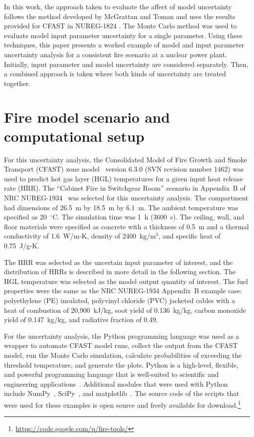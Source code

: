 \documentclass[12pt]{article}
\begin{document}
In this work, the approach taken to evaluate the affect of model uncertainty follows the method developed by McGrattan and Toman and uses the results provided for CFAST in NUREG-1824 \cite{NUREG_1824_Sup_1}. The Monte Carlo method was used to evaluate model input parameter uncertainty for a single parameter. Using these techniques, this paper presents a worked example of model and input parameter uncertainty analysis for a consistent fire scenario at a  nuclear power plant.  Initially, input parameter and model uncertainty are considered separately. Then, a combined approach is taken where both kinds of uncertainty are treated together.

\section{Fire model scenario and computational setup}
\label{sec:fire_model_scenario_setup}

For this uncertainty analysis, the Consolidated Model of Fire Growth and Smoke Transport (CFAST) zone model~\cite{CFAST_Users_Guide_6} version 6.3.0 (SVN revision number 1462) was used to predict hot gas layer (HGL) temperatures for a given input heat release rate (HRR). The ``Cabinet Fire in Switchgear Room'' scenario in Appendix~B of NRC NUREG-1934~\cite{NUREG_1934} was selected for this uncertainty analysis. The compartment had dimensions of 26.5~m by 18.5~m by 6.1~m. The ambient temperature was specified as 20~$^\circ$C. The simulation time was 1~h (3600~s). The ceiling, wall, and floor materials were specified as concrete with a thickness of 0.5~m and a thermal conductivity of 1.6~W/m-K, density of 2400~kg/m$^3$, and specific heat of 0.75~J/g-K.

The HRR was selected as the uncertain input parameter of interest, and the distribution of HRRs is described in more detail in the following section. The HGL temperature was selected as the model output quantity of interest. The fuel properties were the same as the NRC NUREG-1934 Appendix~B example case: polyethylene (PE) insulated, polyvinyl chloride (PVC) jacketed cables with a heat of combustion of 20,900~kJ/kg, soot yield of 0.136~kg/kg, carbon monoxide yield of 0.147~kg/kg, and radiative fraction of 0.49.

For the uncertainty analysis, the Python programming language was used as a wrapper to automate CFAST model runs, collect the output from the CFAST model, run the Monte Carlo simulation, calculate probabilities of exceeding the threshold temperature, and generate the plots. Python is a high-level, flexible, and powerful programming language that is well-suited to scientific and engineering applications~\cite{Oliphant:2007}. Additional modules that were used with Python include NumPy~\cite{oliphant2006guide}, SciPy~\cite{Jones:2001fk}, and matplotlib~\cite{Hunter:2007}. The source code of the scripts that were used for these examples is open source and freely available for download.\footnote{\url{https://code.google.com/p/fire-tools/}}
\end{document}
